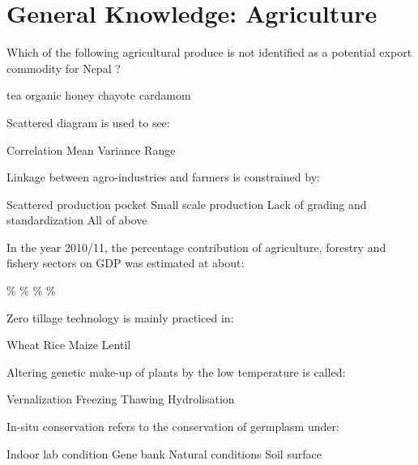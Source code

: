 \section*{General Knowledge: Agriculture}

\begin{questions}


\question Which of the following agricultural produce is not identified as a potential export commodity for Nepal ?
  \begin{choices}
  \choice tea
  \choice organic honey
  \choice chayote
  \choice cardamom
  \end{choices}

\question Scattered diagram is used to see:
  \begin{choices}
  \choice Correlation
  \choice Mean
  \choice Variance
  \choice Range
  \end{choices}

\question Linkage between agro-industries and farmers is constrained by:
  \begin{choices}
  \choice Scattered production pocket
  \choice Small scale production
  \choice Lack of grading and standardization
  \choice All of above
  \end{choices}

\question In the year 2010/11, the percentage contribution of agriculture, forestry and fishery sectors on GDP was estimated at about:
  \begin{choices}
  \%
  \%
  \%
  \%
  \end{choices}

\question Zero tillage technology is mainly practiced in:
  \begin{choices}
  \choice Wheat
  \choice Rice
  \choice Maize
  \choice Lentil
  \end{choices}

\question Altering genetic make-up of plants by the low temperature is called:
  \begin{choices}
  \choice Vernalization
  \choice Freezing
  \choice Thawing
  \choice Hydrolisation
  \end{choices}

\question In-situ conservation refers to the conservation of germplasm under:
  \begin{choices}
  \choice Indoor lab condition
  \choice Gene bank
  \choice Natural conditions
  \choice Soil surface
  \end{choices}


\end{questions}
